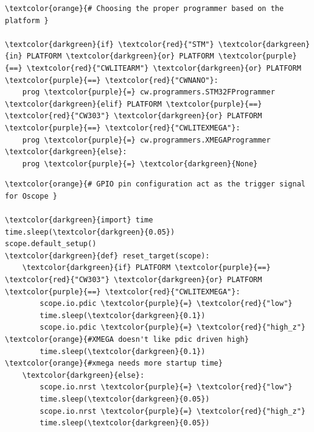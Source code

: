 \documentclass[11pt]{article}
\begin{document}
\begin{small} 
\begin{tcolorbox}
\begin{Verbatim}[commandchars=\\\{\}]
\textcolor{orange}{# Choosing the proper programmer based on the platform }

\textcolor{darkgreen}{if} \textcolor{red}{"STM"} \textcolor{darkgreen}{in} PLATFORM \textcolor{darkgreen}{or} PLATFORM \textcolor{purple}{==} \textcolor{red}{"CWLITEARM"} \textcolor{darkgreen}{or} PLATFORM \textcolor{purple}{==} \textcolor{red}{"CWNANO"}:
    prog \textcolor{purple}{=} cw.programmers.STM32FProgrammer
\textcolor{darkgreen}{elif} PLATFORM \textcolor{purple}{==} \textcolor{red}{"CW303"} \textcolor{darkgreen}{or} PLATFORM \textcolor{purple}{==} \textcolor{red}{"CWLITEXMEGA"}:
    prog \textcolor{purple}{=} cw.programmers.XMEGAProgrammer
\textcolor{darkgreen}{else}:
    prog \textcolor{purple}{=} \textcolor{darkgreen}{None}
\end{Verbatim}
\end{tcolorbox}
\end{small} 

\begin{small} 
\begin{tcolorbox}
\begin{Verbatim}[commandchars=\\\{\}]
\textcolor{orange}{# GPIO pin configuration act as the trigger signal for Oscope }

\textcolor{darkgreen}{import} time
time.sleep(\textcolor{darkgreen}{0.05})
scope.default_setup()
\textcolor{darkgreen}{def} reset_target(scope):
    \textcolor{darkgreen}{if} PLATFORM \textcolor{purple}{==} \textcolor{red}{"CW303"} \textcolor{darkgreen}{or} PLATFORM \textcolor{purple}{==} \textcolor{red}{"CWLITEXMEGA"}:
        scope.io.pdic \textcolor{purple}{=} \textcolor{red}{"low"}
        time.sleep(\textcolor{darkgreen}{0.1})
        scope.io.pdic \textcolor{purple}{=} \textcolor{red}{"high_z"}  \textcolor{orange}{#XMEGA doesn't like pdic driven high}
        time.sleep(\textcolor{darkgreen}{0.1})           \textcolor{orange}{#xmega needs more startup time}
    \textcolor{darkgreen}{else}:  
        scope.io.nrst \textcolor{purple}{=} \textcolor{red}{"low"}
        time.sleep(\textcolor{darkgreen}{0.05})
        scope.io.nrst \textcolor{purple}{=} \textcolor{red}{"high_z"}
        time.sleep(\textcolor{darkgreen}{0.05})
\end{Verbatim}
\end{tcolorbox}
\end{small} 
\end{document}
